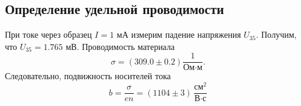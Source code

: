 \documentclass[12pt]{article}
\begin{document}
\subsection*{Определение удельной проводимости}	
	При токе через образец $I = 1$ мА измерим падение напряжения $U_\text{35}$. Получим, что $U_\text{35} = 1.765$ мВ. Проводимость материала 
	\[
		\sigma  = \left(309.0 \pm 0.2 \right) \frac{1}{\text{Ом} \cdot \text{м}}.  
	\]
	Следовательно, подвижность носителей тока 
	\[
		b = \frac{\sigma}{e n} = \left(1104\pm 3\right) \, \frac{{\text{см}}^2}{\text{В} \cdot \text{с}}
	\]
\end{document}
